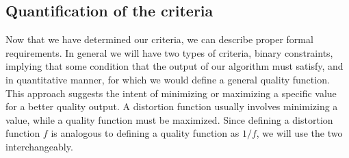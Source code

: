 \documentclass[a4paper,11pt]{article}
\begin{document}
\subsection{Quantification of the criteria}

Now that we have determined our criteria, we can describe proper formal requirements. In
general we will have two types of criteria, binary constraints, implying that some condition
that the output of our algorithm must satisfy, and in quantitative manner, for which we
would define a general quality function. This approach suggests the intent of minimizing
or maximizing a specific value for a better quality output. A distortion function usually
involves minimizing a value, while a quality function must be maximized. Since defining a
distortion function $f$ is analogous to defining a quality function as $1/f$, we will use the two
interchangeably.
\end{document}
